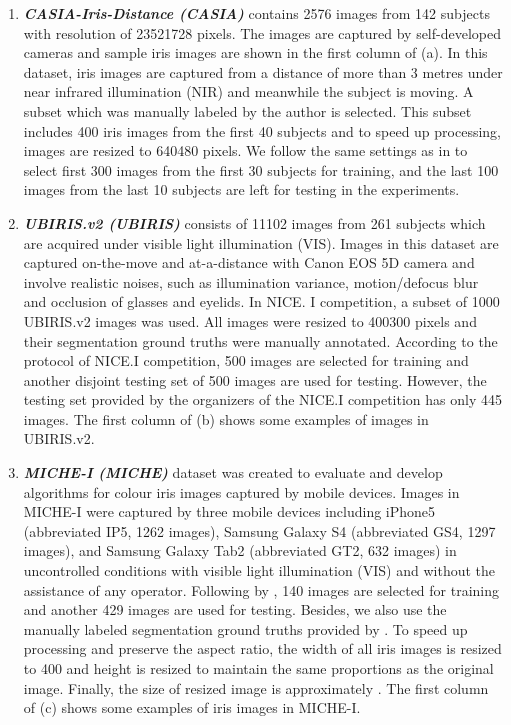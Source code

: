 \documentclass[journal]{IEEEtran}
\begin{document}
\begin{enumerate}
\item  \textbf{\emph{CASIA-Iris-Distance (CASIA)}} contains 2576 images from 142 subjects with resolution of 23521728 pixels. The images are captured by self-developed cameras and sample iris images are shown in the first column of  (a). In this dataset, iris images are captured from a distance of more than 3 metres under near infrared illumination (NIR) and meanwhile the subject is moving. A subset which was manually labeled by the author\cite{liu2016accurate} is selected. This subset includes 400 iris images from the first 40 subjects and to speed up processing, images are resized to 640480 pixels. We follow the same settings as in \cite{liu2016accurate} to select first 300 images from the first 30 subjects for training, and the last 100 images from the last 10 subjects are left for testing in the experiments.
\item  \textbf{\emph{UBIRIS.v2 (UBIRIS)}} consists of 11102 images from 261 subjects which are acquired under visible light illumination (VIS). Images in this dataset are captured on-the-move and at-a-distance with Canon EOS 5D camera and involve realistic noises, such as illumination variance, motion/defocus blur and occlusion of glasses and eyelids. In NICE. I competition, a subset of 1000 UBIRIS.v2 images was used. All images were resized to 400300 pixels and their segmentation ground truths were manually annotated. According to the protocol of NICE.I competition, 500 images are selected for training and another disjoint testing set of 500 images are used for testing. However, the testing set provided by the organizers of the NICE.I competition has only 445 images. The first column of  (b) shows some examples of images in UBIRIS.v2.
\item  \textbf{\emph{MICHE-I (MICHE)}} dataset was created to evaluate and develop algorithms for colour iris images captured by mobile devices. Images in MICHE-I were captured by three mobile devices including iPhone5 (abbreviated IP5, 1262 images), Samsung Galaxy S4 (abbreviated GS4, 1297 images), and Samsung Galaxy Tab2 (abbreviated GT2, 632 images) in uncontrolled conditions with visible light illumination (VIS) and without the assistance of any operator\cite{Marsico2017Results}. Following by \cite{Hu2015Improving},
    140 images are selected for training and another 429 images are used for testing. Besides, we also use the manually labeled segmentation ground truths provided by \cite{Hu2015Improving}. To speed up processing and preserve the aspect ratio, the width of all iris images is resized to 400 and height is resized to maintain the same proportions as the original image. Finally, the size of resized image is approximately . The first column of  (c) shows some examples of iris images in MICHE-I.
\end{enumerate}
\end{document}
